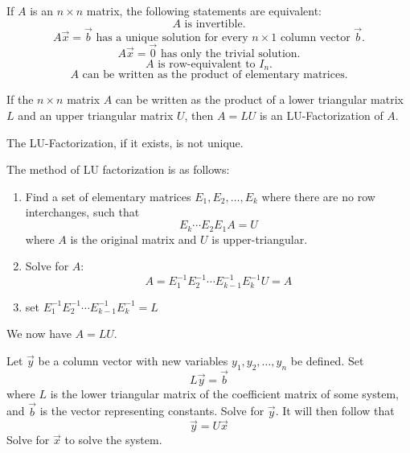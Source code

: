 \begin{theorem}
    If \(A\) is an \(n\times n\) matrix, the following statements are equivalent:
    \[
        A\text{ is invertible.}
    \]
    \[
        A\vec{x}=\vec{b}\text{ has a unique solution for every }n\times 1\text{ column vector }\vec{b}.
    \]
\[
    A\vec{x}=\vec{0}\text{ has only the trivial solution.} 
\]
    \[
        A\text{ is row-equivalent to }I_n. 
    \]
    \[
        A\text{ can be written as the product of elementary matrices.} 
    \]
\end{theorem}
\begin{definition}[LU-Factorization]
    If the \(n\times n\) matrix \(A\) can be written as the product of a lower triangular matrix \(L\) and an upper triangular matrix \(U\), then \(A=LU\) is an LU-Factorization of \(A\).
\end{definition}
\begin{remark}
    The LU-Factorization, if it exists, is not unique.
\end{remark}
The method of LU factorization is as follows:
\begin{enumerate}
    \item Find a set of elementary matrices \(E_1,E_2,\ldots,E_k\) where there are no row interchanges, such that
    \[
        E_k\cdots E_2E_1 A=U
    \]
    where \(A\) is the original matrix and \(U\) is upper-triangular.
    \item Solve for \(A\):
\[
    A=E_1 ^{-1} E_2 ^{-1} \cdots E_{k-1} ^{-1} E_k ^{-1} U=A  
\]
    \item set \(E_1 ^{-1} E_2 ^{-1} \cdots E_{k-1} ^{-1} E_k ^{-1}=L\)
\end{enumerate}
We now have \(A=LU\).
\begin{theorem}
    Let \(\vec{y}\) be a column vector with new variables \(y_1,y_2,\ldots,y_n\) be defined. Set
    \[
        L\vec{y}=\vec{b}
    \]
    where \(L\) is the lower triangular matrix of the coefficient matrix of some system, and \(\vec{b}\) is the vector representing constants. Solve for \(\vec{y}\). It will then follow that
    \[
        \vec{y}=U\vec{x}
    \]
    Solve for \(\vec{x}\) to solve the system.
\end{theorem}

